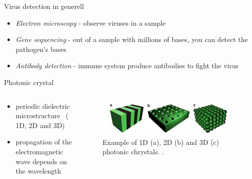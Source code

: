 \begin{frame}{Virus detection in generell}
  \begin{itemize}
    \setlength\itemsep{1.2em}
    \item{\emph{Electron microscopy} - observe viruses in a sample   }
    \item{\emph{Gene sequencing} - out of a sample with millions of bases, you can detect the pathogen's bases   }
    \item{\emph{ Antibody detection} - immune system produce antibodies to fight the virus }
    \end{itemize}
\end{frame}

\begin{frame}{Photonic crystal}
  \begin{columns}

    \begin{column}{0.49\textwidth}
    \begin{itemize}
      \setlength\itemsep{1.2em}
      \item{periodic dielectric microstructure \, ( 1D, 2D and 3D)}
      \item{propagation of the electromagnetic wave depends on the wavelength}
    \end{itemize}
    \end{column}

    \begin{column}{0.49\textwidth}
    \begin{figure}
      \centering
      \includegraphics[width=1\textwidth]{./bilder/photonic_crystal_model.png}
      \caption{Example of 1D (a), 2D (b) and 3D (c) photonic chrystals. \cite{intro_pho}.}
      \label{fig: photonic_crystal}
    \end{figure}
  \end{column}

  \end{columns}

\end{frame}

